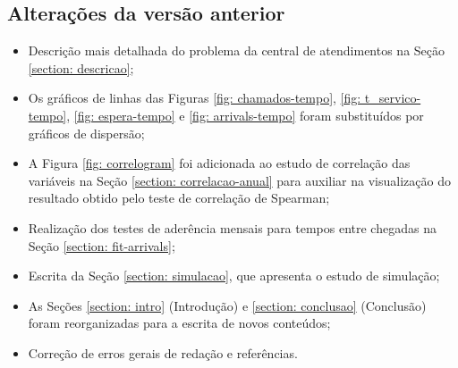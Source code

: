 \subsection{Alterações da versão anterior}
\begin{itemize}
    \item Descrição mais detalhada do problema da central de atendimentos na Seção \ref*{section: descricao};
    \item Os gráficos de linhas das Figuras \ref*{fig: chamados-tempo}, \ref*{fig: t_servico-tempo}, \ref*{fig: espera-tempo} e \ref*{fig: arrivals-tempo} foram substituídos por gráficos de dispersão;
    \item A Figura \ref*{fig: correlogram} foi adicionada ao estudo de correlação das variáveis na Seção \ref*{section: correlacao-anual} para auxiliar na visualização do resultado obtido pelo teste de correlação de Spearman;
    \item Realização dos testes de aderência mensais para tempos entre chegadas na Seção \ref*{section: fit-arrivals};
    \item Escrita da Seção \ref*{section: simulacao}, que apresenta o estudo de simulação;
    \item As Seções \ref*{section: intro} (Introdução) e \ref*{section: conclusao} (Conclusão) foram reorganizadas para a escrita de novos conteúdos;
    \item Correção de erros gerais de redação e referências.
\end{itemize}